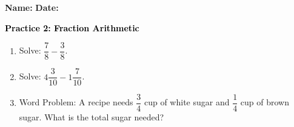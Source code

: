 \documentclass[12pt, letterpaper, fleqn]{article}
\begin{document}
\textbf{Name:} \underline{\hspace{5cm}}
\hfill
\textbf{Date:} \underline{\hspace{3cm}}\\

\begin{tcolorbox}[colback=customteal!20]
    \large\textcolor{black}{\textbf{Practice 2: Fraction Arithmetic}}
\end{tcolorbox}
\begin{enumerate}[itemsep=3.5cm, leftmargin=0.6cm]
\item Solve: $\dfrac{7}{8} - \dfrac{3}{8}$.
\vspace{3.5cm}
\item Solve: $4\dfrac{3}{10} - 1\dfrac{7}{10}$.
\vspace{3.5cm}
\item Word Problem: A recipe needs $\dfrac{3}{4}$ cup of white sugar and $\dfrac{1}{4}$ cup of brown sugar. What is the total sugar needed?
\end{enumerate}
\end{document}
